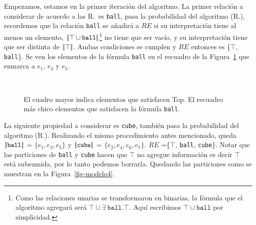 Empezamos, estamos en la primer iteraci\'on del algoritmo. La primer relaci\'on a considerar de acuerdo a las R.\puse\ es \texttt{ball}, pasa la probabilidad del algoritmo (R.\randomuse), recordemos que la relaci\'on \texttt{ball} se a\~nadir\'a a $RE$ si su interpretaci\'on tiene al menos un elemento, $|\!|\top \cup \texttt{ball}|\!|$\footnote{Como las relaciones unarias se transformaron en binarias, la f\'ormula que el algoritmo agregar\'a ser\'a $\top \cup \exists\ \texttt{ball}.\top$. Aqu\'i escribimos $\top \cup \texttt{ball}$ por simplicidad.} no tiene que ser vac\'io, y su interpretaci\'on tiene que ser distinta de $|\!|\top|\!|$. Ambas condiciones se cumplen y $RE$ entonces es \{$\top$, \texttt{ball}\}. Se ven los elementos de la f\'ormula \texttt{ball} en el recuadro de la Figura~\ref{fig-modelo3} que enmarca a $e_1$, $e_3$ y $e_5$.

\begin{figure}[h]
\begin{center}
\\[0pt]
\caption{El cuadro mayor indica elementos que satisfacen Top. El recuadro m\'as chico elementos que satisfacen la f\'ormula \protect\texttt{ball}.}
\label{fig-modelo3}
\end{center}
\end{figure}

La siguiente propiedad a considerar es \texttt{cube}, tambi\'en pasa la probabilidad del algoritmo (R.\randomuse). Realizando el mismo procedimiento antes mencionado, queda $|\!|\texttt{ball}|\!|$ = $\{e_1,e_3,e_5\}$ y
$|\!|\texttt{cube}|\!|$ = $\{e_2, e_4, e_6, e_7\}$. $RE$ =\{$\top$, \texttt{ball}, \texttt{cube}\}. Notar que las particiones de  \texttt{ball} y \texttt{cube} hacen que $\top$ no agregue informaci\'on es decir $\top$ est\'a subsumida, por lo tanto podemos borrarla. Quedando las particiones como se muestran en la Figura~\ref{fig-modelo4}.

